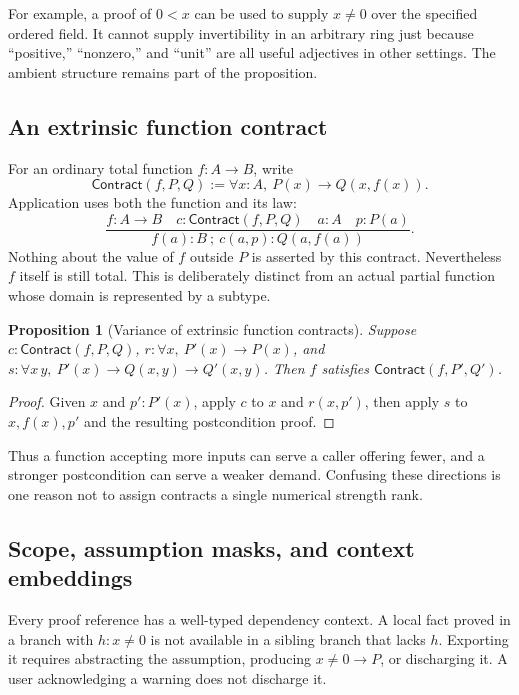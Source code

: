 \documentclass[11pt,a4paper]{article}
\newtheorem{proposition}[theorem]{Proposition}
\theoremstyle{definition}
\begin{document}
For example, a proof of $0<x$ can be used to supply $x\ne0$ over the specified
ordered field. It cannot supply invertibility in an arbitrary ring just because
``positive,'' ``nonzero,'' and ``unit'' are all useful adjectives in other
settings. The ambient structure remains part of the proposition.

\subsection{An extrinsic function contract}
For an ordinary total function $f:A\to B$, write
\begin{equation}\label{eq:contract}
 \mathsf{Contract}(f,P,Q)
 :=\forall x:A,\ P(x)\to Q(x,f(x)).
\end{equation}
Application uses both the function and its law:
\[
 \frac{f:A\to B\quad c:\mathsf{Contract}(f,P,Q)\quad
       a:A\quad p:P(a)}
      {f(a):B\ ;\ c(a,p):Q(a,f(a))}.
\]
Nothing about the value of $f$ outside $P$ is asserted by this contract.
Nevertheless $f$ itself is still total. This is deliberately distinct from an
actual partial function whose domain is represented by a subtype.

\begin{proposition}[Variance of extrinsic function contracts]
Suppose $c:\mathsf{Contract}(f,P,Q)$,
$r:\forall x,\ P'(x)\to P(x)$, and
$s:\forall x\,y,\ P'(x)\to Q(x,y)\to Q'(x,y)$.
Then $f$ satisfies $\mathsf{Contract}(f,P',Q')$.
\end{proposition}
\begin{proof}
Given $x$ and $p':P'(x)$, apply $c$ to $x$ and $r(x,p')$, then apply $s$ to
$x,f(x),p'$ and the resulting postcondition proof.
\end{proof}

Thus a function accepting more inputs can serve a caller offering fewer, and a
stronger postcondition can serve a weaker demand. Confusing these directions is
one reason not to assign contracts a single numerical strength rank.

\subsection{Scope, assumption masks, and context embeddings}
Every proof reference has a well-typed dependency context. A local fact proved
in a branch with $h:x\ne0$ is not available in a sibling branch that lacks $h$.
Exporting it requires abstracting the assumption, producing $x\ne0\to P$,
or discharging it. A user acknowledging a warning does not discharge it.
\end{document}
